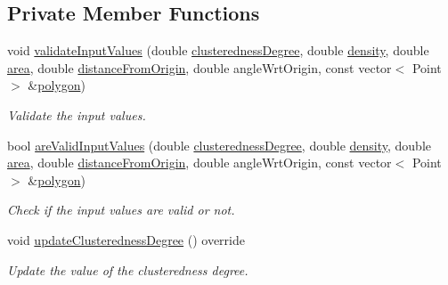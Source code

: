 \subsection*{\-Private \-Member \-Functions}
\begin{DoxyCompactItemize}
\item 
void \hyperlink{classmultiscale_1_1analysis_1_1Region_a517b46fd89696f44086aafb1a9526995}{validate\-Input\-Values} (double \hyperlink{classmultiscale_1_1analysis_1_1SpatialEntityPseudo3D_a22a84312e7c497cc5fbc4d8b41d8fd45}{clusteredness\-Degree}, double \hyperlink{classmultiscale_1_1analysis_1_1SpatialEntityPseudo3D_aedf807816f8c2f7cd961acfe0042fc56}{density}, double \hyperlink{classmultiscale_1_1analysis_1_1SpatialEntityPseudo3D_a1621d5b3ece663bf4c5501940e860292}{area}, double \hyperlink{classmultiscale_1_1analysis_1_1SpatialEntityPseudo3D_a056f67b90ed41c0e6dc4df31b71ad906}{distance\-From\-Origin}, double angle\-Wrt\-Origin, const vector$<$ \-Point $>$ \&\hyperlink{classmultiscale_1_1analysis_1_1Region_a40d1b47f30bb09c6a47521a968163b6d}{polygon})
\begin{DoxyCompactList}\small\item\em \-Validate the input values. \end{DoxyCompactList}\item 
bool \hyperlink{classmultiscale_1_1analysis_1_1Region_a6319de4734b11039dbb90dfdd3e30e31}{are\-Valid\-Input\-Values} (double \hyperlink{classmultiscale_1_1analysis_1_1SpatialEntityPseudo3D_a22a84312e7c497cc5fbc4d8b41d8fd45}{clusteredness\-Degree}, double \hyperlink{classmultiscale_1_1analysis_1_1SpatialEntityPseudo3D_aedf807816f8c2f7cd961acfe0042fc56}{density}, double \hyperlink{classmultiscale_1_1analysis_1_1SpatialEntityPseudo3D_a1621d5b3ece663bf4c5501940e860292}{area}, double \hyperlink{classmultiscale_1_1analysis_1_1SpatialEntityPseudo3D_a056f67b90ed41c0e6dc4df31b71ad906}{distance\-From\-Origin}, double angle\-Wrt\-Origin, const vector$<$ \-Point $>$ \&\hyperlink{classmultiscale_1_1analysis_1_1Region_a40d1b47f30bb09c6a47521a968163b6d}{polygon})
\begin{DoxyCompactList}\small\item\em \-Check if the input values are valid or not. \end{DoxyCompactList}\item 
void \hyperlink{classmultiscale_1_1analysis_1_1Region_a35c88944e2704571214b6e28dd657350}{update\-Clusteredness\-Degree} () override
\begin{DoxyCompactList}\small\item\em \-Update the value of the clusteredness degree. \end{DoxyCompactList}\item 

\end{DoxyCompactItemize}

